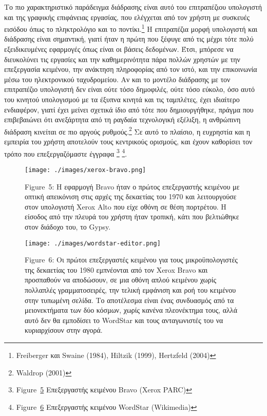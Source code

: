 \documentclass[
]{article}
\begin{document}
Το πιο χαρακτηριστικό παράδειγμα διάδρασης είναι αυτό του επιτραπέζιου
υπολογιστή και της γραφικής επιφάνειας εργασίας, που ελέγχεται από τον
χρήστη με συσκευές εισόδου όπως το πληκτρολόγιο και το
ποντίκι.\footnote{Freiberger και Swaine (1984), Hiltzik (1999),
  Hertzfeld (2004)} Η επιτραπέζια μορφή υπολογιστή και διάδρασης είναι
σημαντική, γιατί ήταν η πρώτη που ξέφυγε από τις μέχρι τότε πολύ
εξειδικευμένες εφαρμογές όπως είναι οι βάσεις δεδομένων. Έτσι, μπόρεσε
να διευκολύνει τις εργασίες και την καθημερινότητα πάρα πολλών χρηστών
με την επεξεργασία κειμένου, την ανάκτηση πληροφορίας από τον ιστό, και
την επικοινωνία μέσω του ηλεκτρονικού ταχυδρομείου. Αν και το μοντέλο
διάδρασης με τον επιτραπέζιο υπολογιστή δεν είναι ούτε τόσο δημοφιλές,
ούτε τόσο εύκολο, όσο αυτό του κινητού υπολογισμού με τα έξυπνα κινητά
και τις ταμπλέτες, έχει ιδιαίτερο ενδιαφέρον, γιατί έχει μείνει σχετικά
ίδιο από τότε που δημιουργήθηκε, πράγμα που επιβεβαιώνει ότι ανεξάρτητα
από τη ραγδαία τεχνολογική εξέλιξη, η ανθρώπινη διάδραση κινείται σε πιο
αργούς ρυθμούς.\footnote{Waldrop (2001)} Σε αυτό το πλαίσιο, η ευχρηστία
και η εμπειρία του χρήστη αποτελούν τους κεντρικούς ορισμούς, και έχουν
καθορίσει τον τρόπο που επεξεργαζόμαστε έγγραφα \footnote{Figure~\protect\hyperlink{fig:xerox-bravo}{5}
  Επεξεργαστής κειμένου Bravo (Xerox PARC)} \footnote{Figure~\protect\hyperlink{fig:wordstar-editor}{6}
  Επεξεργαστής κειμένου WordStar (Wikimedia)}.

\leavevmode{}%
\begin{figure}
\hypertarget{fig:xerox-bravo}{%
\centering
\texttt{[image: ./images/xerox-bravo.png]}
\caption{Figure~5: Η εφαρμογή Bravo ήταν ο πρώτος επεξεργαστής κειμένου
με οπτική απεικόνιση στις αρχές της δεκαετίας του 1970 και λειτουργούσε
στον υπολογιστή Xerox Alto που είχε οθόνη σε θέση πορτρέτου. Η είσοδος
από την πλευρά του χρήστη ήταν τροπική, κάτι που βελτιώθηκε στον διάδοχο
του, το Gypsy.}\label{fig:xerox-bravo}
}
\end{figure}

\leavevmode{}%
\begin{figure}
\hypertarget{fig:wordstar-editor}{%
\centering
\texttt{[image: ./images/wordstar-editor.png]}
\caption{Figure~6: Οι πρώτοι επεξεργαστές κειμένου για τους
μικροϋπολογιστές της δεκαετίας του 1980 εμπνέονται από τον Xerox Bravo
και προσπαθούν να αποδώσουν, σε μια οθόνη απλού κειμένου χωρίς πολλαπλές
γραμματοσειρές, την τελική εμφάνιση και ροή του κειμένου στην τυπωμένη
σελίδα. Το αποτέλεσμα είναι ένας συνδυασμός από τα μειονεκτήματα των δύο
κόσμων, χωρίς κανένα πλεονέκτημα τους, αλλά αυτό δεν θα εμποδίσει το
WordStar και τους ανταγωνιστές του να κυριαρχίσουν στην
αγορά.}\label{fig:wordstar-editor}
}
\end{figure}
\end{document}
